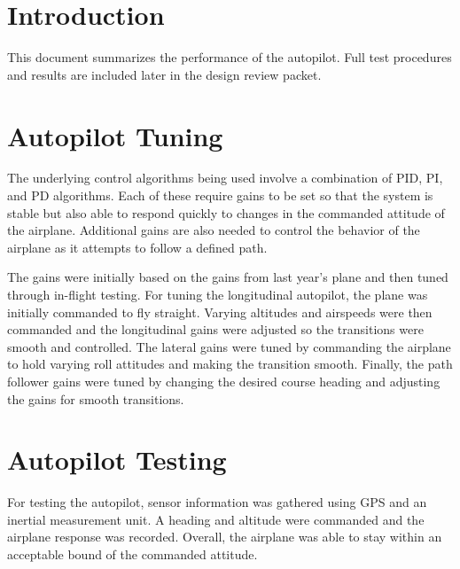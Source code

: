 \documentclass[]{auvsi_doc}
\begin{document}
\begin{AUVSITitlePage}
\begin{artifacttable}
\end{artifacttable}
\end{AUVSITitlePage}


\section{Introduction}
This document summarizes the performance of the autopilot. Full test procedures and results are included later in the design review packet.

\section{Autopilot Tuning}

The underlying control algorithms being used involve a combination of PID, PI, and PD algorithms. Each of these require gains to be set so that the system is stable but also able to respond quickly to changes in the commanded attitude of the airplane. Additional gains are also needed to control the behavior of the airplane as it attempts to follow a defined path.


The gains were initially based on the gains from last year's plane and then tuned through in-flight testing. For tuning the longitudinal autopilot, the plane was initially commanded to fly straight. Varying altitudes and airspeeds were then commanded and the longitudinal gains were adjusted so the transitions were smooth and controlled. The lateral gains were tuned by commanding the airplane to hold varying roll attitudes and making the transition smooth. Finally, the path follower gains were tuned by changing the desired course heading and adjusting the gains for smooth transitions.

\section{Autopilot Testing}

For testing the autopilot, sensor information was gathered using GPS and an inertial measurement unit. A heading and altitude were commanded and the airplane response was recorded. Overall, the airplane was able to stay within an acceptable bound of the commanded attitude. 
\end{document}
